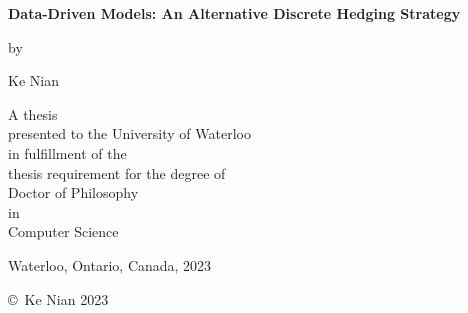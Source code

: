 \pagestyle{empty}

\begin{titlepage}
        \begin{center}
        \vspace*{1.0cm}

        \Huge
        {\bf Data-Driven Models: An Alternative Discrete Hedging Strategy }

        \vspace*{1.0cm}

        \normalsize
        by \\

        \vspace*{1.0cm}

        \Large
        Ke Nian \\

        \vspace*{3.0cm}

        \normalsize
        A thesis \\
        presented to the University of Waterloo \\
        in fulfillment of the \\
        thesis requirement for the degree of \\
        Doctor of Philosophy \\
        in \\
        Computer Science \\

        \vspace*{2.0cm}

        Waterloo, Ontario, Canada, 2023 \\

        \vspace*{1.0cm}

        \copyright\ Ke Nian 2023 \\
        \end{center}
\end{titlepage}

\pagestyle{plain}
\setcounter{page}{2}

